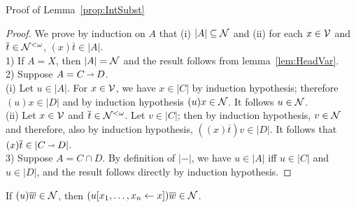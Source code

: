 \documentclass{llncs} %
\begin{document}
Proof of Lemma~\ref{prop:IntSubst}

\begin{proof}
We prove by induction on $A$ that (i) $ |A| \subseteq  \mathcal{N}$ and (ii) for each $x\in \mathcal{V}$ and $\overline{t} \in \mathcal{N}^{<\omega}$, $(x)\overline{t} \in |A|$.
\\
1) If $A=X$, then $|A| =\mathcal{N}$ and the result follows from lemma~\ref{lem:HeadVar}.
\\
2) Suppose $A=C\vlim D$.
\\
(i) Let $u \in |A|$. For $x \in \mathcal{V}$, we have $x\in |C|$ by induction hypothesis; therefore $(u)x \in |D|$ and by induction hypothesis $(u)x \in \mathcal{N}$. It follows  $u \in \mathcal{N}$.
\\
(ii) Let $x\in \mathcal{V}$ and $\overline{t} \in \mathcal{N}^{<\omega}$. Let $v\in |C|$; then by induction hypothesis,  $v\in \mathcal{N}$ and therefore, also by induction hypothesis, $((x)\overline{t})v \in |D|$. It follows that $(x)\overline{t} \in |C \vlim D|$.
\\
3) Suppose $A=C \cap D$. By definition of $|-|$, we have $u\in |A|$ iff $u\in |C|$ and $u\in |D|$, and the result follows directly by induction hypothesis.
\end{proof}

\begin{lemma}\label{lem:SN-AddSharings}
If $(u)\overline{w} \in \mathcal{N}$, then $(u\share xx)\overline{w} \in \SN$.
\end{lemma}
\end{document}
